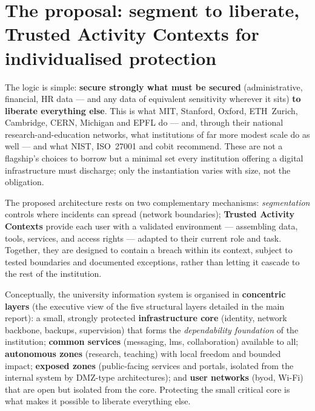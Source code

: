 
\section{The proposal: segment to liberate, Trusted Activity Contexts for individualised protection}

The logic is simple: \textbf{secure strongly what must be secured}
(administrative, financial, HR data --- and any data of equivalent
sensitivity wherever it sits) \textbf{to liberate everything else}.
This is what MIT, Stanford, Oxford, ETH~Zurich, Cambridge, CERN,
Michigan and EPFL do --- and, through their national research-and-education
networks, what institutions of far more modest scale do as well ---
and what NIST, ISO~27001 and \gls{cobit} recommend. These are not a
flagship's choices to borrow but a minimal set every institution
offering a digital infrastructure must discharge; only the
instantiation varies with size, not the obligation.

The proposed architecture rests on two complementary mechanisms:
\emph{segmentation} controls where incidents can spread (network
boundaries); \textbf{Trusted Activity Contexts} provide each user with
a validated environment --- assembling data, tools, services, and access
rights --- adapted to their current role and task. Together, they are
designed to contain a breach within its context, subject to tested
boundaries and documented exceptions, rather than letting it cascade to
the rest of the institution.

Conceptually, the university information system is organised in
\textbf{concentric layers} (the executive view of the five structural
layers detailed in the main report): a small, strongly protected
\textbf{infrastructure core} (identity, network backbone, backups,
supervision) that forms the \emph{dependability foundation} of the
institution; \textbf{common services} (messaging, \gls{lms}, collaboration)
available to all; \textbf{autonomous zones} (research, teaching) with
local freedom and bounded impact; \textbf{exposed zones} (public-facing
services and portals, isolated from the internal system by DMZ-type
architectures); and \textbf{user networks} (\gls{byod},
Wi-Fi) that are open but isolated from the core. Protecting the small
critical core is what makes it possible to liberate everything else.


